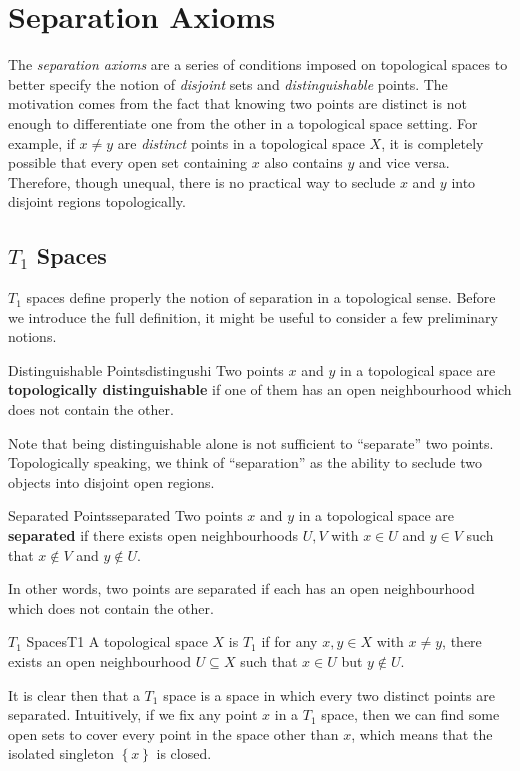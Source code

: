 \documentclass[math]{amznotes}
\theoremstyle{remark}
\begin{document}
\chapter{Separation Axioms}
The \textit{separation axioms} are a series of conditions imposed on topological spaces to better specify the notion of \textit{disjoint} sets and \textit{distinguishable} points. The motivation comes from the fact that knowing two points are distinct is not enough to differentiate one from the other in a topological space setting. For example, if $x \neq y$ are \textit{distinct} points in a topological space $X$, it is completely possible that every open set containing $x$ also contains $y$ and vice versa. Therefore, though unequal, there is no practical way to seclude $x$ and $y$ into disjoint regions topologically.
\section{$T_1$ Spaces}
$T_1$ spaces define properly the notion of separation in a topological sense. Before we introduce the full definition, it might be useful to consider a few preliminary notions.
\begin{dfnbox}{Distinguishable Points}{distingushi}
    Two points $x$ and $y$ in a topological space are {\color{red} \textbf{topologically distinguishable}} if one of them has an open neighbourhood which does not contain the other.
\end{dfnbox}
Note that being distinguishable alone is not sufficient to ``separate'' two points. Topologically speaking, we think of ``separation'' as the ability to seclude two objects into disjoint open regions.
\begin{dfnbox}{Separated Points}{separated}
    Two points $x$ and $y$ in a topological space are {\color{red} \textbf{separated}} if there exists open neighbourhoods $U, V$ with $x \in U$ and $y \in V$ such that $x \notin V$ and $y \notin U$.
\end{dfnbox}
In other words, two points are separated if each has an open neighbourhood which does not contain the other.
\begin{dfnbox}{$T_1$ Spaces}{T1}
    A topological space $X$ is {\color{red} \textbf{$T_1$}} if for any $x, y \in X$ with $x \neq y$, there exists an open neighbourhood $U \subseteq X$ such that $x \in U$ but $y \notin U$. 
\end{dfnbox}
It is clear then that a $T_1$ space is a space in which every two distinct points are separated. Intuitively, if we fix any point $x$ in a $T_1$ space, then we can find some open sets to cover every point in the space other than $x$, which means that the isolated singleton $\left\{x\right\}$ is closed.
\end{document}
